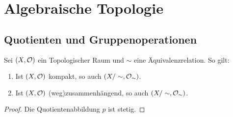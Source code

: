 \documentclass{report}
\begin{document}
\part{Algebraische Topologie}
\chapter{Quotienten und Gruppenoperationen}
\begin{theorem}
	Sei $(X, \mathcal{O})$ ein Topologischer Raum und $\sim$ eine Äquivalenzrelation. So gilt:
	\begin{enumerate}
		\item Ist $(X, \mathcal{O})$ kompakt, so auch $(X/\sim, \mathcal{O}_\sim)$.
		\item Ist $(X, \mathcal{O})$ (weg)zusammenhängend, so auch $(X/\sim, \mathcal{O}_\sim)$.
	\end{enumerate}
\end{theorem}
\begin{proof}
	Die Quotientenabbildung $p$ ist stetig.
\end{proof}
\end{document}
